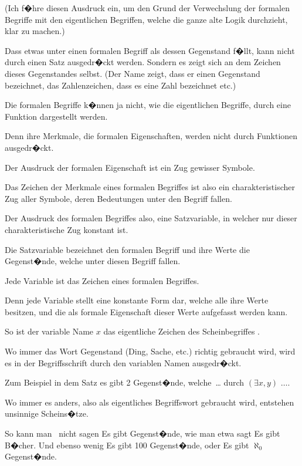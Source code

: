 \begin{propositions}
{(Ich f�hre diesen Ausdruck ein, um den Grund
der Verwechslung der formalen Begriffe mit den
eigentlichen Begriffen, welche die ganze alte Logik
durchzieht, klar zu machen.)

Dass etwas unter einen formalen Begriff als
dessen Gegenstand f�llt, kann nicht durch einen
Satz ausgedr�ckt werden. Sondern es zeigt sich
an dem Zeichen dieses Gegenstandes selbst. (Der
Name zeigt, dass er einen Gegenstand bezeichnet,
das Zahlenzeichen, dass es eine Zahl bezeichnet etc.)

Die formalen Begriffe k�nnen ja nicht, wie
die eigentlichen Begriffe, durch eine Funktion
dargestellt werden.

Denn ihre Merkmale, die formalen Eigenschaften,
werden nicht durch Funktionen ausgedr�ckt.

Der Ausdruck der formalen Eigenschaft ist ein
Zug gewisser Symbole.

Das Zeichen der Merkmale eines formalen
Begriffes ist also ein charakteristischer Zug aller
Symbole, deren Bedeutungen unter den Begriff
fallen.

Der Ausdruck des formalen Begriffes also, eine
Satzvariable, in welcher nur dieser charakteristische
Zug konstant ist.}


{Die Satzvariable bezeichnet den formalen
Begriff und ihre Werte die Gegenst�nde, welche
unter diesen Begriff fallen.}


{Jede Variable ist das Zeichen eines formalen
Begriffes.

Denn jede Variable stellt eine konstante Form
dar, welche alle ihre Werte besitzen, und die als
\enlargethispage{-4pt} %
formale Eigenschaft dieser Werte aufgefasst werden
kann.}


{So ist der variable Name \glqq{}$x$\grqq{} das eigentliche
Zeichen des Scheinbegriffes .

Wo immer das Wort \glqq{}Gegenstand\grqq{} (\glqq{}Ding\grqq{},
\glqq{}Sache\grqq{}, etc.) richtig gebraucht wird, wird es in
der Begriffsschrift durch den variablen Namen
ausgedr�ckt.

Zum Beispiel in dem Satz \glqq{}es gibt 2 Gegenst�nde,
welche\ \ldots\grqq{} durch \glqq{}$(\exists x, y)$ $\ldots$\grqq{}.

Wo immer es anders, also als eigentliches
Begriffswort gebraucht wird, entstehen unsinnige
Scheins�tze.

So kann man \zumBeispiel\ nicht sagen \glqq{}Es gibt Gegenst�nde\grqq{},
wie man etwa sagt \glqq{}Es gibt B�cher\grqq{}.
Und ebenso wenig \glqq{}Es gibt 100 Gegenst�nde\grqq{},
oder \glqq{}Es gibt $\aleph_0$ Gegenst�nde\grqq{}.

}
\end{propositions}
